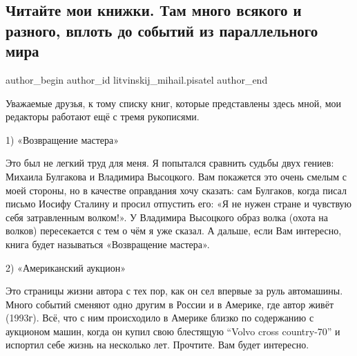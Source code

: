  
 
 
 
 
 
\subsection{Читайте мои книжки. Там много всякого и разного, вплоть до событий из параллельного мира}
\label{sec:25_11_2019.fb.litvinskij_mihail.pisatel.1.knizhki}
 
\ifcmt
 author_begin
   author_id litvinskij_mihail.pisatel
 author_end
\fi

Уважаемые друзья, к тому списку книг, которые представлены здесь мной, мои
редакторы работают ещё с тремя рукописями.

1) «Возвращение мастера»

Это был не легкий труд для меня. Я попытался сравнить судьбы двух гениев:
Михаила Булгакова и Владимира Высоцкого. Вам покажется это очень смелым с моей
стороны, но в качестве оправдания хочу сказать: сам Булгаков, когда писал
письмо Иосифу Сталину и просил отпустить его: «Я не нужен стране и чувствую
себя затравленным волком!». У Владимира Высоцкого образ волка (охота на волков)
пересекается с тем о чём я уже сказал. А дальше, если Вам интересно, книга
будет называться «Возвращение мастера».


2) «Американский аукцион»

Это страницы жизни автора с тех пор, как он сел впервые за руль автомашины.
Много событий сменяют одно другим в России и в Америке, где автор живёт
(1993г). Всё, что с ним происходило в Америке близко по содержанию с аукционом
машин, когда он купил свою блестящую \enquote{Volvo cross country-70} и испортил себе
жизнь на несколько лет. Прочтите. Вам будет интересно.

